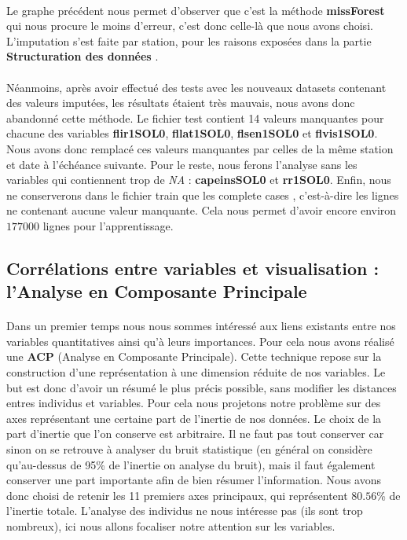 \documentclass[14pt, openany]{article}
\begin{document}
\paragraph{}
Le graphe précédent nous permet d'observer que c'est la méthode \textbf{missForest} qui nous procure le moins d'erreur, c'est donc celle-là que nous avons choisi. L'imputation s'est faite par station, pour les raisons exposées dans la partie \og \textbf{Structuration des données} \fg{}.
\paragraph{}
Néanmoins, après avoir effectué des tests avec les nouveaux datasets contenant des valeurs imputées, les résultats étaient très mauvais, nous avons donc abandonné cette méthode. Le fichier test contient 14 valeurs manquantes pour chacune des variables \textbf{flir1SOL0}, \textbf{fllat1SOL0}, \textbf{flsen1SOL0} et \textbf{flvis1SOL0}. Nous avons donc remplacé ces valeurs manquantes par celles de la même station et date à l'échéance suivante. Pour le reste, nous ferons l'analyse sans les variables qui contiennent trop de \textit{NA} : \textbf{capeinsSOL0} et \textbf{rr1SOL0}. Enfin, nous ne conserverons dans le fichier train que les \og complete cases \fg{}, c'est-à-dire les lignes ne contenant aucune valeur manquante. Cela nous permet d'avoir encore environ $177000$ lignes pour l'apprentissage.
\subsection{Corrélations entre variables et visualisation : l'Analyse en Composante Principale}

\paragraph{}
Dans un premier temps nous nous sommes intéressé aux liens existants entre nos variables quantitatives ainsi qu'à leurs importances. Pour cela nous avons réalisé une \textbf{ACP} (Analyse en Composante Principale). Cette technique repose sur la construction d'une représentation à une dimension réduite de nos variables. Le but est donc d'avoir un résumé le plus précis possible, sans modifier les distances entres individus et variables. Pour cela nous projetons notre problème sur des axes représentant une certaine part de l'inertie de nos données. Le choix de la part d'inertie que l'on conserve est arbitraire. Il ne faut pas tout conserver car sinon on se retrouve à analyser du bruit statistique (en général on considère qu'au-dessus de 95\% de l'inertie on analyse du bruit), mais il faut également conserver une part importante afin de bien résumer l'information. Nous avons donc choisi de retenir les 11 premiers axes principaux, qui représentent $80.56$\% de l'inertie totale. L'analyse des individus ne nous intéresse pas (ils sont trop nombreux), ici nous allons focaliser notre attention sur les variables.
\end{document}
